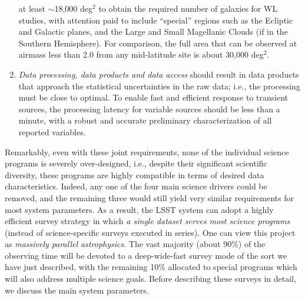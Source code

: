 \begin{enumerate}
   at least $\sim$18,000 deg$^2$ to obtain the required number of galaxies
   for WL studies, with attention paid to include ``special''
   regions such as the Ecliptic and Galactic planes, and the Large and Small
   Magellanic Clouds (if in the Southern Hemisphere).  For comparison,
   the full area that can be observed at airmass less than 2.0 from
   any mid-latitude site is about 30,000 deg$^2$.
\item  \textit{Data processing, data products and data access} should
  result in data products that approach the statistical uncertainties
  in the raw data; i.e., the processing must be close to optimal.
To enable fast and efficient response to
   transient sources, the processing latency for variable sources should be less than a minute,
   with a robust and accurate preliminary characterization
   of all reported variables.
\end{enumerate}

Remarkably, even with these joint requirements, none of the
individual science programs is severely over-designed, i.e., despite
their significant scientific diversity, these programs are highly
compatible in terms of desired data characteristics. Indeed, any one
of the four main science drivers could be removed, and the remaining
three would still yield very similar requirements for most system
parameters. As a result, the LSST system can adopt a highly
efficient survey strategy in which \textit{a single dataset serves most science
programs} (instead of science-specific surveys executed in series).
One can view this project as \textit{massively parallel astrophysics}.
The vast majority (about 90\%) of the observing time will be devoted to
a deep-wide-fast survey mode of the sort we have just described, with
the remaining 10\%
allocated to special programs which will also address multiple science
goals. Before describing these surveys in detail, we discuss the main
system parameters.


